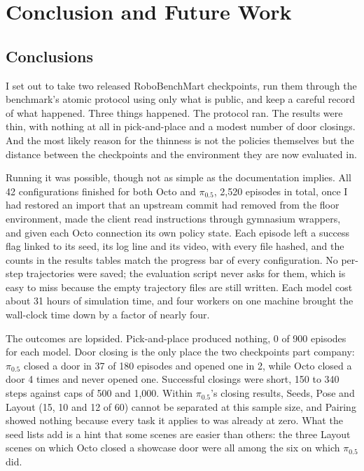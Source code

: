 \chapter{Conclusion and Future Work}
\label{chap:conclusion}
\begingroup
\justifying
\setlength{\parindent}{2em}
\setlength{\parskip}{0.55\baselineskip}

\section{Conclusions}

I set out to take two released RoboBenchMart checkpoints, run them through the benchmark's atomic protocol using only what is public, and keep a careful record of what happened. Three things happened. The protocol ran. The results were thin, with nothing at all in pick-and-place and a modest number of door closings. And the most likely reason for the thinness is not the policies themselves but the distance between the checkpoints and the environment they are now evaluated in.

Running it was possible, though not as simple as the documentation implies. All 42 configurations finished for both Octo and $\pi_{0.5}$, 2,520 episodes in total, once I had restored an import that an upstream commit had removed from the floor environment, made the client read instructions through gymnasium wrappers, and given each Octo connection its own policy state. Each episode left a success flag linked to its seed, its log line and its video, with every file hashed, and the counts in the results tables match the progress bar of every configuration. No per-step trajectories were saved; the evaluation script never asks for them, which is easy to miss because the empty trajectory files are still written. Each model cost about 31 hours of simulation time, and four workers on one machine brought the wall-clock time down by a factor of nearly four.

The outcomes are lopsided. Pick-and-place produced nothing, 0 of 900 episodes for each model. Door closing is the only place the two checkpoints part company: $\pi_{0.5}$ closed a door in 37 of 180 episodes and opened one in 2, while Octo closed a door 4 times and never opened one. Successful closings were short, 150 to 340 steps against caps of 500 and 1,000. Within $\pi_{0.5}$'s closing results, Seeds, Pose and Layout (15, 10 and 12 of 60) cannot be separated at this sample size, and Pairing showed nothing because every task it applies to was already at zero. What the seed lists add is a hint that some scenes are easier than others: the three Layout scenes on which Octo closed a showcase door were all among the six on which $\pi_{0.5}$ did.

